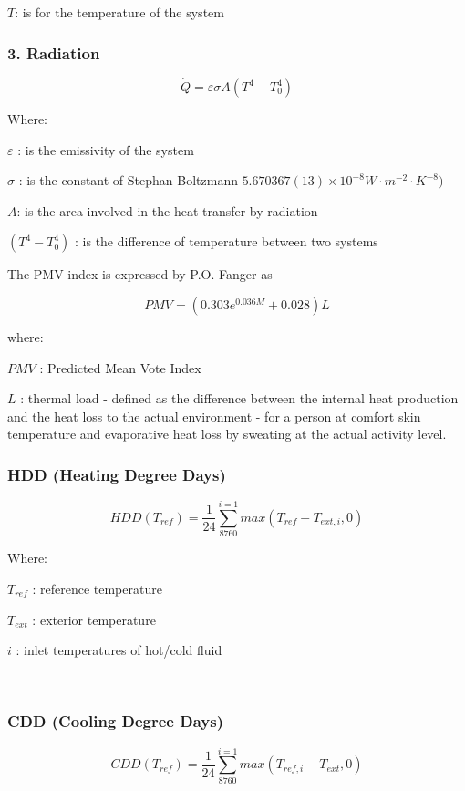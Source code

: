 \documentclass[]{book}
\theoremstyle{definition}
\theoremstyle{definition}
\theoremstyle{definition}
\theoremstyle{remark}
\begin{document}
\(T\): is for the temperature of the system

\subsubsection{3. Radiation}\label{radiation}

\[\dot{Q}= \varepsilon \sigma A ({T^{4}-T_0^{4}})\]

Where:

\(\varepsilon\) : is the emissivity of the system

\(\sigma\) : is the constant of Stephan-Boltzmann
\(5.670367(13)\times10^{-8} W \cdot m^{-2} \cdot K^{-8} )\)

\(A\): is the area involved in the heat transfer by radiation

\(({T^{4}-T_0^{4}})\) : is the difference of temperature between two
systems

The PMV index is expressed by P.O. Fanger as

\[ PMV = (0.303e ^{0.036M} + 0.028) L \]

where:

\(PMV\) : Predicted Mean Vote Index

\(L\) : thermal load - defined as the difference between the internal
heat production and the heat loss to the actual environment - for a
person at comfort skin temperature and evaporative heat loss by sweating
at the actual activity level.

\subsubsection{HDD (Heating Degree Days)}\label{hdd-heating-degree-days}

\[HDD (T_{ref}) =\frac{1}{24}\sum_{8760}^{i=1} max (T_{ref}- T_{ext, i} , 0)\]

Where:

\(T_{ref}\) : reference temperature

\(T_{ext}\) : exterior temperature

\(i\) : inlet temperatures of hot/cold fluid

~

\subsubsection{CDD (Cooling Degree Days)}\label{cdd-cooling-degree-days}

\[CDD (T_{ref}) =\frac{1}{24}\sum_{8760}^{i=1} max (T_{ref, i}- T_{ext} , 0)\]
\end{document}
